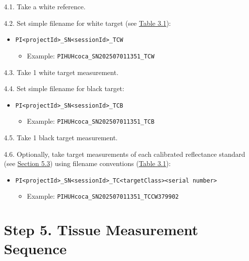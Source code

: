 \documentclass[
  letterpaper,
  DIV=11,
  numbers=noendperiod]{scrreprt}
\providecommand{\tightlist}{%
  \setlength{\itemsep}{0pt}\setlength{\parskip}{0pt}}
\begin{document}
4.1. Take a white reference.

4.2. Set simple filename for white target (see \hyperref[tbl-3-1]{Table
3.1}):

\begin{itemize}
\tightlist
\item
  \texttt{PI\textless{}projectId\textgreater{}\_SN\textless{}sessionId\textgreater{}\_TCW}

  \begin{itemize}
  \tightlist
  \item
    Example: \texttt{PIHUHcoca\_SN202507011351\_TCW}
  \end{itemize}
\end{itemize}

4.3. Take 1 white target measurement.

4.4. Set simple filename for black target:

\begin{itemize}
\tightlist
\item
  \texttt{PI\textless{}projectId\textgreater{}\_SN\textless{}sessionId\textgreater{}\_TCB}

  \begin{itemize}
  \tightlist
  \item
    Example: \texttt{PIHUHcoca\_SN202507011351\_TCB}
  \end{itemize}
\end{itemize}

4.5. Take 1 black target measurement.

4.6. Optionally, take target measurements of each calibrated reflectance
standard (see
\hyperref[instrumentation-and-materials-quality-control]{Section 5.3})
using filename conventions (\hyperref[tbl-3-1]{Table 3.1}):

\begin{itemize}
\tightlist
\item
  \texttt{PI\textless{}projectId\textgreater{}\_SN\textless{}sessionId\textgreater{}\_TC\textless{}targetClass\textgreater{}\textless{}serial\ number\textgreater{}}

  \begin{itemize}
  \tightlist
  \item
    Example: \texttt{PIHUHcoca\_SN202507011351\_TCCW379902}
  \end{itemize}
\end{itemize}

\section{Step 5. Tissue Measurement
Sequence}\label{step-5.-tissue-measurement-sequence}
\end{document}

